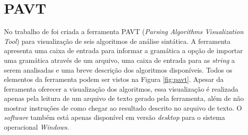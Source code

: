 \section{PAVT}
No trabalho de \textcite{sangal2018pavt} foi criada a ferramenta PAVT (\textit{Parsing Algorithms Visualization Tool}) para visualização de seis algoritmos de análise sintática. A ferramenta apresenta uma caixa de entrada para informar a gramática a opção de importar uma gramática através de um arquivo, uma caixa de entrada para as \textit{string} a serem analisadas e uma breve descrição dos algoritmos disponíveis. Todos os elementos da ferramenta podem ser vistos na Figura \ref{fig:pavt}. Apesar da ferramenta oferecer a visualização dos algoritmos, essa visualização é realizada apenas pela leitura de um arquivo de texto gerado pela ferramenta, além de não mostrar instruções de como chegar ao resultado descrito no arquivo de texto. O \textit{software} também está apenas disponível em versão \textit{desktop} para o sistema operacional \textit{Windows}.

\begin{figure}[t!]
    \captionsetup{width=16cm}
\end{figure}

